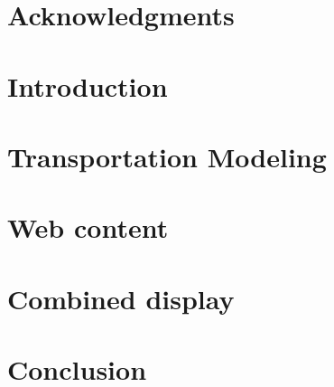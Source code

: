 \documentclass[12pt, a4paper, final]{report}
\begin{document}
\chapter*{Acknowledgments}


\setlength{\parskip}{0em}
\tableofcontents
\setlength{\parskip}{1em}

\chapter*{Introduction}


\chapter{Transportation Modeling}




\chapter{Web content}



\chapter{Combined display}



\chapter*{Conclusion}





\appendix

\newpage


\setlength{\parskip}{0em}
\listoffigures
\listoftables


\printglossaries
\end{document}
